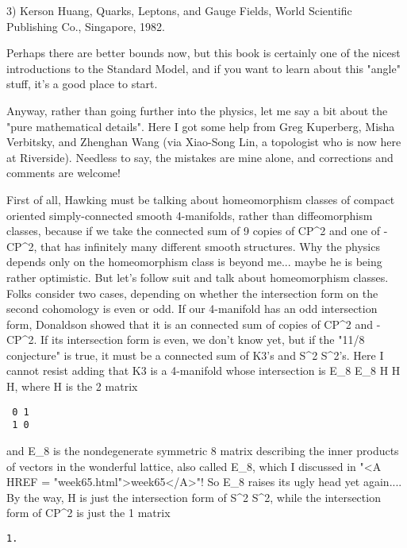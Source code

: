 3) Kerson Huang, Quarks, Leptons, and Gauge Fields, World Scientific
Publishing Co., Singapore, 1982.  

Perhaps there are better bounds now, but this book is certainly one of
the nicest introductions to the Standard Model, and if you want to 
learn about this "\theta  angle" stuff, it's a good place to start.

Anyway, rather than going further into the physics, let me say a bit
about the "pure mathematical details".  Here I got some help from
Greg Kuperberg, Misha Verbitsky, and Zhenghan Wang (via Xiao-Song Lin, a
topologist who is now here at Riverside).  Needless to say, the mistakes
are mine alone, and corrections and comments are welcome!

First of all, Hawking must be talking about homeomorphism classes of
compact oriented simply-connected smooth 4-manifolds, rather than
diffeomorphism classes, because if we take the connected sum of 9
copies of CP^{2} and one of -CP^{2}, that has
infinitely many different smooth structures.  Why the physics depends
only on the homeomorphism class is beyond me... maybe he is being
rather optimistic.  But let's follow suit and talk about homeomorphism
classes.  Folks consider two cases, depending on whether the
intersection form on the second cohomology is even or odd.  If our
4-manifold has an odd intersection form, Donaldson showed that it is
an connected sum of copies of CP^{2} and -CP^{2}.  If
its intersection form is even, we don't know yet, but if the "11/8
conjecture" is true, it must be a connected sum of K3's and
S^{2} \times  S^{2}'s.  Here I cannot resist adding
that K3 is a 4-manifold whose intersection is E_{8} \oplus 
E_{8} \oplus  H \oplus  H \oplus  H, where H is the 2 matrix

\begin{verbatim}
 0 1
 1 0
\end{verbatim}
    

and E_{8} is the nondegenerate symmetric 8 matrix describing
the inner products of vectors in the wonderful lattice, also called
E_{8}, which I discussed in "<A HREF =
"week65.html">week65</A>"!  So E_{8} raises its ugly head yet
again....  By the way, H is just the intersection form of
S^{2} \times  S^{2}, while the intersection form of
CP^{2} is just the 1 matrix

\begin{verbatim}
1.
\end{verbatim}
    

